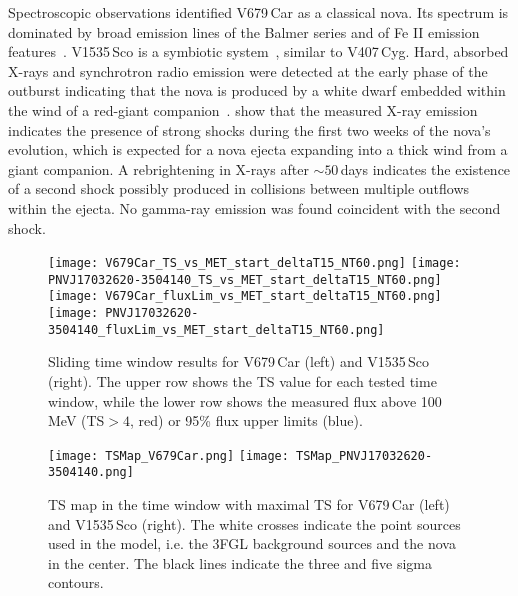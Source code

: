 \documentclass{aa} %
\begin{document}
Spectroscopic observations identified V679\,Car as a classical nova. Its spectrum is dominated by broad emission lines of the Balmer series and of Fe II emission features~\citep{IAUC8999}. 
V1535\,Sco is a symbiotic system~\citep[][see also Sec.~\ref{subsec:recsymnovae}]{2015MNRAS.454.1297S}, similar to V407\,Cyg. Hard, absorbed X-rays and synchrotron radio emission were detected at the early phase of the outburst indicating that the nova is produced by a white dwarf embedded within the wind of a red-giant companion~\citep {ATel7060,ATel7085}.
\citet{2017ApJ...842...73L} show that the measured X-ray emission indicates the presence of strong shocks during the first two weeks of the nova's evolution, which is expected for a nova ejecta expanding into a thick wind
from a giant companion. A rebrightening in X-rays after $\sim50$\,days indicates the existence of a second shock possibly produced in collisions between multiple outflows within the ejecta. No gamma-ray emission was found coincident with the second shock.


\begin{figure*}[htb!]
\begin{center}
\texttt{[image: V679Car\_TS\_vs\_MET\_start\_deltaT15\_NT60.png]}
\texttt{[image: PNVJ17032620-3504140\_TS\_vs\_MET\_start\_deltaT15\_NT60.png]}
\texttt{[image: V679Car\_fluxLim\_vs\_MET\_start\_deltaT15\_NT60.png]}
\texttt{[image: PNVJ17032620-3504140\_fluxLim\_vs\_MET\_start\_deltaT15\_NT60.png]}
\noindent
\caption{\small Sliding time window results for V679\,Car (left) and V1535\,Sco (right). The upper row shows the TS value for each tested time window, while the lower row shows the measured flux above 100\,MeV (TS$>4$, red) or 95\% flux upper limits (blue).}
\label{fig:TSLC}
\end{center}
\end{figure*}


\begin{figure*}[htb!]
\begin{center}
\texttt{[image: TSMap\_V679Car.png]}
\texttt{[image: TSMap\_PNVJ17032620-3504140.png]}
\noindent
\caption{\small TS map in the time window with maximal TS for V679\,Car (left) and V1535\,Sco (right). The white crosses indicate the point sources used in the model, i.e. the 3FGL background sources and the nova in the center. The black lines indicate the three and five sigma contours.}
\label{fig:TSmap}
\end{center}
\end{figure*}
\end{document}
